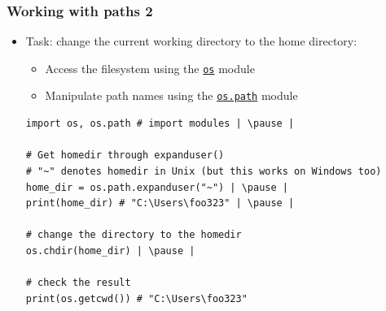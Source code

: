 \documentclass[xcolor=table]{beamer}
\begin{document}
\begin{frame}[fragile]
    \frametitle{Working with paths 2}
    \begin{itemize}
        \item Task: change the current working directory to the home directory: \pause
    \begin{itemize}
            \item Access the filesystem using the \href{https://docs.python.org/3.7/library/os.html#module-os}{\texttt{os}} module 
            \item Manipulate path names using the \href{https://docs.python.org/3.7/library/os.path.html}{\texttt{os.path}} module \pause
    \end{itemize}
\begin{lstlisting}[style=python]
import os, os.path # import modules | \pause |

# Get homedir through expanduser()
# "~" denotes homedir in Unix (but this works on Windows too)
home_dir = os.path.expanduser("~") | \pause |
print(home_dir) # "C:\Users\foo323" | \pause |

# change the directory to the homedir
os.chdir(home_dir) | \pause |

# check the result
print(os.getcwd()) # "C:\Users\foo323"
\end{lstlisting}
    \end{itemize}
\end{frame}

\end{document}
